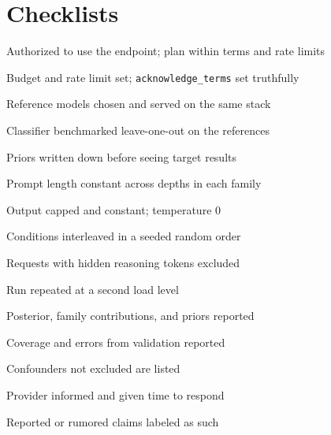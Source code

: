 \documentclass[11pt,letterpaper]{article}
\newcommand{\cfg}[1]{\texttt{\small #1}}
\begin{document}
\section{Checklists}
\label{sec:checklists}

\begin{tcbraster}[raster columns=3, raster equal height, raster column skip=8pt]
\begin{tcolorbox}[checkcard, title={\ding{110}\hspace{0.4em}Before probing}]
\begin{checklist}
  \item Authorized to use the endpoint; plan within terms and rate limits
  \item Budget and rate limit set; \cfg{acknowledge\_terms} set truthfully
  \item Reference models chosen and served on the same stack
  \item Classifier benchmarked leave-one-out on the references
  \item Priors written down before seeing target results
\end{checklist}
\end{tcolorbox}
\begin{tcolorbox}[checkcard, colframe=darkamber, colbacktitle=darkamber, title={\ding{110}\hspace{0.4em}Per measurement run}]
\begin{checklist}
  \item Prompt length constant across depths in each family
  \item Output capped and constant; temperature 0
  \item Conditions interleaved in a seeded random order
  \item Requests with hidden reasoning tokens excluded
  \item Run repeated at a second load level
\end{checklist}
\end{tcolorbox}
\begin{tcolorbox}[checkcard, colframe=campaignred, colbacktitle=campaignred, title={\ding{110}\hspace{0.4em}Before publishing}]
\begin{checklist}
  \item Posterior, family contributions, and priors reported
  \item Coverage and errors from validation reported
  \item Confounders not excluded are listed
  \item Provider informed and given time to respond
  \item Reported or rumored claims labeled as such
\end{checklist}
\end{tcolorbox}
\end{tcbraster}
\end{document}
